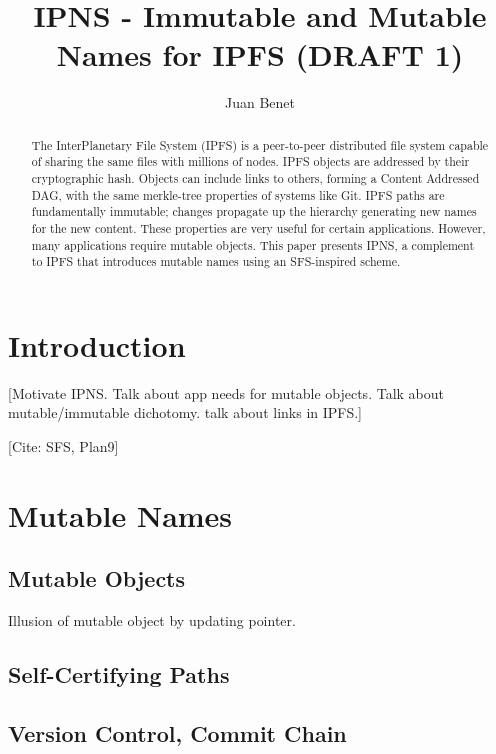 \documentclass{sig-alternate}
\begin{document}
\title{IPNS - Immutable and Mutable Names for IPFS (DRAFT 1)}
\subtitle{}


\author{
\alignauthor
  Juan Benet\\
}

\maketitle
\begin{abstract}
The InterPlanetary File System (IPFS) is a peer-to-peer distributed file system
capable of sharing the same files with millions of nodes. IPFS objects are addressed by their cryptographic hash. Objects can include links to others, forming a Content Addressed DAG, with the same merkle-tree properties of systems like Git. IPFS paths are fundamentally immutable; changes propagate up the hierarchy generating new names for the new content. These properties are very useful for certain applications. However, many applications require mutable objects. This paper presents IPNS, a complement to IPFS that introduces mutable names using an SFS-inspired scheme.
\end{abstract}

\section{Introduction}

[Motivate IPNS. Talk about app needs for mutable objects. Talk about mutable/immutable dichotomy. talk about links in IPFS.]

[Cite: SFS, Plan9]


\section{Mutable Names}

\subsection{Mutable Objects}
Illusion of mutable object by updating pointer.
\subsection{Self-Certifying Paths}
\subsection{Version Control, Commit Chain}
\end{document}
